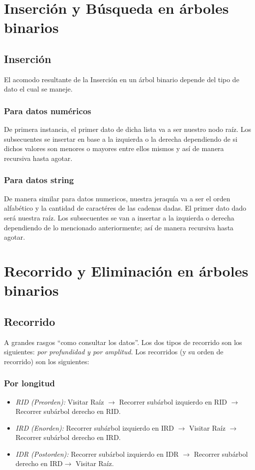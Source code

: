 \documentclass[letterpaper, 12pt]{article}
\begin{document}
\begin{justify}
            \section{Inserción y Búsqueda en árboles binarios}
            \subsection{Inserción}
            El acomodo resultante de la Inserción en un árbol binario depende del tipo de dato el cual se maneje.
            \subsubsection{Para datos numéricos}
            De primera instancia, el primer dato de dicha lista va a ser nuestro nodo raíz. Los subsecuentes se insertar en base a la izquierda o la derecha dependiendo de si dichos valores son menores o mayores entre ellos mismos y así de manera recursiva hasta agotar.
            \subsubsection{Para datos string}
            De manera similar para datos numericos, nuestra jeraquía va a ser el orden alfabético y la cantidad de caractéres de las cadenas dadas. El primer dato dado será nuestra raíz. Los subsecuentes se van a insertar a la izquierda o derecha dependiendo de lo mencionado anteriormente; así de manera recursiva hasta agotar. 
            \section{Recorrido y Eliminación en árboles binarios}
            \subsection{Recorrido}
            A grandes rasgos ``como consultar los datos''. Los dos tipos de recorrido son los siguientes: \emph{por profundidad y por amplitud.} Los recorridos (y su orden de recorrido) son los siguientes:
            \subsubsection{Por longitud}
            \begin{itemize}
                \item \emph{RID (Preorden):} Visitar Raíz \(\rightarrow\) Recorrer subárbol izquierdo en RID \(\rightarrow\) Recorrer subárbol derecho en RID.
                \item \emph{IRD (Enorden):} Recorrer subárbol izquierdo en IRD \(\rightarrow\) Visitar Raíz \(\rightarrow\) Recorrer subárbol derecho en IRD.
                \item \emph{IDR (Postorden):} Recorrer subárbol izquierdo en IDR \(\rightarrow\) Recorrer subárbol derecho en IRD\(\rightarrow\) Visitar Raíz.
            \end{itemize}

\end{justify}
\end{document}
